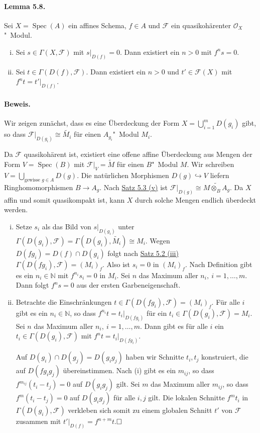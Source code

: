 \documentclass[11pt,b5paper,openany]{memoir}
\def \qed {$\hfill\square$}
\begin{document}
\paragraph{Lemma 5.8.}\label{5.8} Sei $X=\operatorname{Spec}(A)$ ein affines Schema, $f\in A$ und $\mathcal{F}$ ein quasikohärenter $\mathcal{O}_X$"~Modul.
\begin{enumerate}[(i)]
\item Sei $s\in\Gamma(X,\mathcal{F})$ mit $s|_{D(f)}=0$. Dann existiert ein $n>0$ mit $f^ns=0$.
\item Sei $t\in\Gamma(D(f),\mathcal{F})$. Dann existiert ein $n>0$ und $t'\in\mathcal{F}(X)$ mit $f^nt=t'|_{D(f)}$.
\end{enumerate}

\paragraph{Beweis.} Wir zeigen zunächst, dass es eine Überdeckung der Form $X=\bigcup_{i=1}^m D(g_i)$ gibt, so dass $\mathcal{F}|_{D(g_i)}\cong\widetilde{M_i}$ für einen $A_{g_i}$"~Modul $M_i$.

Da $\mathcal{F}$ quasikohärent ist, existiert eine offene affine Überdeckung aus Mengen der Form $V=\operatorname{Spec}(B)$ mit $\mathcal{F}|_V=\widetilde{M}$ für einen $B$"~Modul $M$. Wir schreiben $V=\bigcup_{\text{gewisse }g\in A}D(g)$. Die natürlichen Morphismen $D(g)\hookrightarrow V$ liefern Ringhomomorphismen $B\to A_g$. Nach \hyperref[5.3]{Satz 5.3 (v)} ist $\mathcal{F}|_{D(g)}\cong \widetilde{M\otimes_B A_g}$. Da $X$ affin und somit quasikompakt ist, kann $X$ durch solche Mengen endlich überdeckt werden.
\begin{enumerate}[(i)]
\item Setze $s_i$ als das Bild von $s|_{D(g_i)}$ unter $\Gamma(D(g_i),\mathcal{F})=\Gamma(D(g_i),\widetilde{M_i})\cong M_i$. Wegen $D(fg_i)=D(f)\cap D(g_i)$ folgt nach \hyperref[5.2]{Satz 5.2 (iii)} $\Gamma(D(fg_i),\mathcal{F})=(M_i)_f$. Also ist $s_i=0$ in $(M_i)_f$. Nach Definition gibt es ein $n_i\in\mathbb{N}$ mit $f^{n_i}s_i=0$ in $M_i$. Sei $n$ das Maximum aller $n_i,\ i=1,\ldots,m$. Dann folgt $f^ns=0$ aus der ersten Garbeneigenschaft.
\item Betrachte die Einschränkungen $t\in\Gamma(D(fg_i),\mathcal{F})=(M_i)_f$. Für alle $i$ gibt es ein $n_i\in\mathbb{N}$, so dass $f^{n_i}t=t_i|_{D(fg_i)}$ für ein $t_i\in \Gamma(D(g_i),\mathcal{F})=M_i$. Sei $n$ das Maximum aller $n_i,\ i=1,\ldots,m$. Dann gibt es für alle $i$ ein $t_i\in\Gamma(D(g_i),\mathcal{F})$ mit $f^n t = t_i|_{D(fg_i)}$.

Auf $D(g_i)\cap D(g_j)=D(g_ig_j)$ haben wir Schnitte $t_i,t_j$ konstruiert, die auf $D(fg_ig_j)$ übereinstimmen. Nach (i) gibt es ein $m_{ij}$, so dass $f^{m_{ij}}(t_i-t_j)=0$ auf $D(g_ig_j)$ gilt. Sei $m$ das Maximum aller $m_{ij}$, so dass $f^m(t_i-t_j)=0$ auf $D(g_ig_j)$ für alle $i,j$ gilt. Die lokalen Schnitte $f^mt_i$ in $\Gamma(D(g_i),\mathcal{F})$ verkleben sich somit zu einem globalen Schnitt $t'$ von $\mathcal{F}$ zusammen mit $t'|_{D(f)}=f^{n+m}t$.\qed
\end{enumerate}
\end{document}
